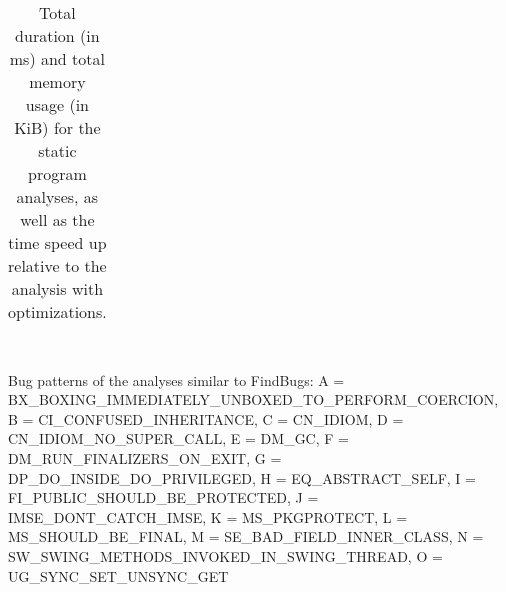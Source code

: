 \begin{table*}
\begin{center}
\begin{tabular}{ l  r  r | r r r | r r r }
\bottomrule
\end{tabular}
\\ {\small Bug patterns of the analyses similar to FindBugs: A = BX\_BOXING\_IMMEDIATELY\_UNBOXED\_TO\_PERFORM\_COERCION, B = CI\_CONFUSED\_INHERITANCE, C = CN\_IDIOM, D = CN\_IDIOM\_NO\_SUPER\_CALL, E = DM\_GC, F = DM\_RUN\_FINALIZERS\_ON\_EXIT, G = DP\_DO\_INSIDE\_DO\_PRIVILEGED, H = EQ\_ABSTRACT\_SELF, I = FI\_PUBLIC\_SHOULD\_BE\_PROTECTED, J = IMSE\_DONT\_CATCH\_IMSE, K = MS\_PKGPROTECT, L = MS\_SHOULD\_BE\_FINAL, M = SE\_BAD\_FIELD\_INNER\_CLASS, N = SW\_SWING\_METHODS\_INVOKED\_IN\_SWING\_THREAD, O = UG\_SYNC\_SET\_UNSYNC\_GET}
\end{center}
\caption{Total duration (in ms) and total memory usage (in KiB) for the static program analyses, as well as the time speed up relative to the analysis with optimizations.}
\label{tbl:analysisbenchmarks}
\end{table*}
